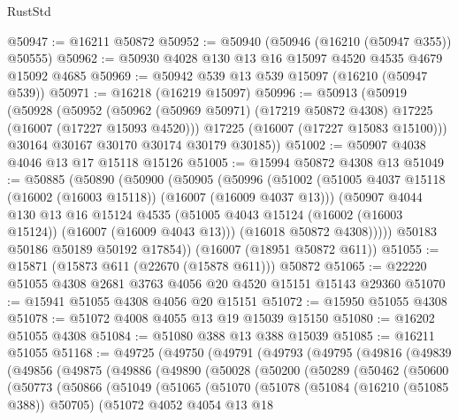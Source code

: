 \begin{lexlean}{RustStd}
\begin{coremodule}
@50947 := @16211 @50872
@50952 := @50940 (@50946 (@16210 (@50947 @355)) @50555)
@50962 := @50930 @4028 @130 @13 @16 @15097 @4520 @4535 @4679 @15092 @4685
@50969 := @50942 @539 @13 @539 @15097 (@16210 (@50947 @539))
@50971 := @16218 (@16219 @15097)
@50996 := @50913
    (@50919
      (@50928
        (@50952
          (@50962 (@50969 @50971) (@17219 @50872 @4308) @17225 (@16007 (@17227 @15093 @4520)))
          @17225
          (@16007 (@17227 @15083 @15100)))
        @30164
        @30167
        @30170
        @30174
        @30179
        @30185))
@51002 := @50907 @4038 @4046 @13 @17 @15118 @15126
@51005 := @15994 @50872 @4308 @13
@51049 := @50885
    (@50890
      (@50900
        (@50905
          (@50996
            (@51002
              (@51005 @4037 @15118 (@16002 (@16003 @15118)) (@16007 (@16009 @4037 @13)))
              (@50907
                @4044
                @130
                @13
                @16
                @15124
                @4535
                (@51005 @4043 @15124 (@16002 (@16003 @15124)) (@16007 (@16009 @4043 @13)))
                (@16018 @50872 @4308)))))
        @50183
        @50186
        @50189
        @50192
        @17854))
    (@16007 (@18951 @50872 @611))
@51055 := @15871 (@15873 @611 (@22670 (@15878 @611))) @50872
@51065 := @22220 @51055 @4308 @2681 @3763 @4056 @20 @4520 @15151 @15143 @29360
@51070 := @15941 @51055 @4308 @4056 @20 @15151
@51072 := @15950 @51055 @4308
@51078 := @51072 @4008 @4055 @13 @19 @15039 @15150
@51080 := @16202 @51055 @4308
@51084 := @51080 @388 @13 @388 @15039
@51085 := @16211 @51055
@51168 := @49725
    (@49750
      (@49791
        (@49793
          (@49795
            (@49816
              (@49839
                (@49856
                  (@49875
                    (@49886
                      (@49890
                        (@50028
                          (@50200
                            (@50289
                              (@50462
                                (@50600
                                  (@50773
                                    (@50866
                                      (@51049
                                        (@51065
                                          (@51070
                                            (@51078
                                              (@51084 (@16210 (@51085 @388)) @50705)
                                              (@51072
                                                @4052
                                                @4054
                                                @13
                                                @18

\end{coremodule}
\end{lexlean}
